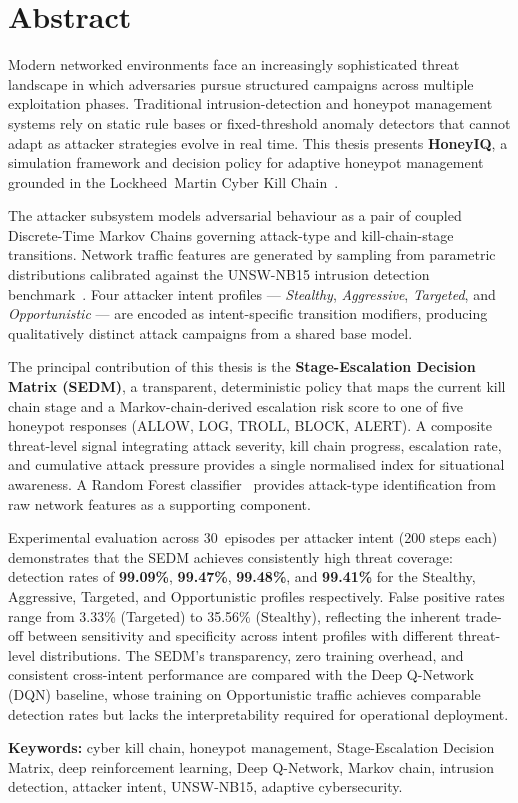 \chapter*{Abstract}

Modern networked environments face an increasingly sophisticated threat landscape
in which adversaries pursue structured campaigns across multiple exploitation
phases.
Traditional intrusion-detection and honeypot management systems rely on static
rule bases or fixed-threshold anomaly detectors that cannot adapt as attacker
strategies evolve in real time.
This thesis presents \textbf{HoneyIQ}, a simulation framework and decision
policy for adaptive honeypot management grounded in the Lockheed~Martin
Cyber Kill Chain~\citep{hutchins2011intelligence}.

The attacker subsystem models adversarial behaviour as a pair of coupled
Discrete-Time Markov Chains governing attack-type and kill-chain-stage
transitions.
Network traffic features are generated by sampling from parametric
distributions calibrated against the UNSW-NB15 intrusion detection
benchmark~\citep{moustafa2015unsw}.
Four attacker intent profiles --- \emph{Stealthy}, \emph{Aggressive},
\emph{Targeted}, and \emph{Opportunistic} --- are encoded as intent-specific
transition modifiers, producing qualitatively distinct attack campaigns from
a shared base model.

The principal contribution of this thesis is the
\textbf{Stage-Escalation Decision Matrix (SEDM)}, a transparent, deterministic
policy that maps the current kill chain stage and a Markov-chain-derived
escalation risk score to one of five honeypot responses
(ALLOW, LOG, TROLL, BLOCK, ALERT).
A composite threat-level signal integrating attack severity, kill chain
progress, escalation rate, and cumulative attack pressure provides a
single normalised index for situational awareness.
A Random Forest classifier~\citep{breiman2001random} provides attack-type
identification from raw network features as a supporting component.

Experimental evaluation across 30~episodes per attacker intent (200 steps
each) demonstrates that the SEDM achieves consistently high threat coverage:
detection rates of \textbf{99.09\%}, \textbf{99.47\%}, \textbf{99.48\%},
and \textbf{99.41\%} for the Stealthy, Aggressive, Targeted, and
Opportunistic profiles respectively.
False positive rates range from 3.33\% (Targeted) to 35.56\% (Stealthy),
reflecting the inherent trade-off between sensitivity and specificity across
intent profiles with different threat-level distributions.
The SEDM's transparency, zero training overhead, and consistent cross-intent
performance are compared with the Deep Q-Network (DQN) baseline, whose
training on Opportunistic traffic achieves comparable detection rates
but lacks the interpretability required for operational deployment.

\vspace{1em}
\noindent\textbf{Keywords:} cyber kill chain, honeypot management, Stage-Escalation
Decision Matrix, deep reinforcement learning, Deep Q-Network, Markov chain,
intrusion detection, attacker intent, UNSW-NB15, adaptive cybersecurity.
\clearpage
